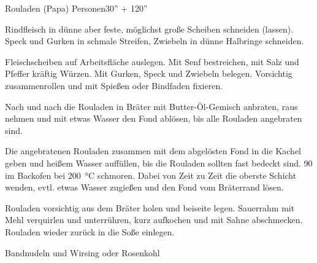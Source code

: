 \begin{MyRecipe}{Rouladen (Papa)}{ Personen}{30'' + 120''}


Rindfleisch in dünne aber feste, möglichst große Scheiben schneiden (lassen).\\
Speck und Gurken in schmale Streifen, Zwiebeln in dünne Halbringe schneiden.\par\bigskip


Fleischscheiben auf Arbeitsfläche auslegen. Mit Senf bestreichen, mit Salz und Pfeffer kräftig Würzen. Mit Gurken, Speck und Zwiebeln belegen. Vorsichtig zusammenrollen und mit Spießen oder Bindfaden fixieren.\par
Nach und nach die Rouladen in Bräter mit Butter-Öl-Gemisch anbraten, raus nehmen und mit etwas Wasser den Fond ablösen, bis alle Rouladen angebraten sind.\par
Die angebratenen Rouladen zusammen mit dem abgelösten Fond in die Kachel geben und heißem Wasser auffüllen, bis die Rouladen sollten fast bedeckt sind. \SI{90}{\min} im Backofen bei \SI{200}{\degreeCelsius} schmoren. Dabei von Zeit zu Zeit die oberste Schicht wenden, evtl. etwas Wasser zugießen und den Fond vom Bräterrand lösen.\par\bigskip


Rouladen vorsichtig aus dem Bräter holen und beiseite legen. Sauerrahm mit Mehl verquirlen und unterrühren, kurz aufkochen und mit Sahne abschmecken. Rouladen wieder zurück in die Soße einlegen.\par\bigskip


Bandnudeln und Wirsing oder Rosenkohl

\end{MyRecipe}